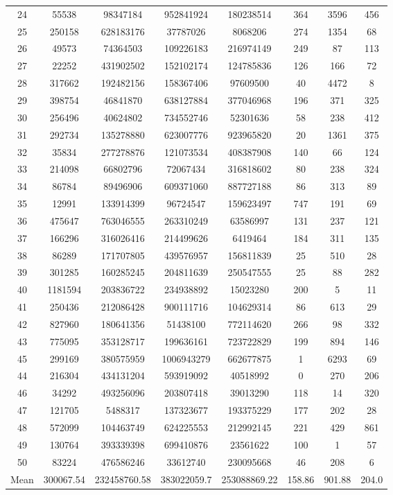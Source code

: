 \documentclass[solution, letterpaper]{cs121}
\begin{document}
\begin{center}
\begin{tabular}{ c |c c c c c c c}
24 & 55538 & 98347184 & 952841924 & 180238514 & 364 & 3596 & 456 \\
25 & 250158 & 628183176 & 37787026 & 8068206 & 274 & 1354 & 68 \\
26 & 49573 & 74364503 & 109226183 & 216974149 & 249 & 87 & 113 \\
27 & 22252 & 431902502 & 152102174 & 124785836 & 126 & 166 & 72 \\
28 & 317662 & 192482156 & 158367406 & 97609500 & 40 & 4472 & 8 \\
29 & 398754 & 46841870 & 638127884 & 377046968 & 196 & 371 & 325 \\
30 & 256496 & 40624802 & 734552746 & 52301636 & 58 & 238 & 412 \\
31 & 292734 & 135278880 & 623007776 & 923965820 & 20 & 1361 & 375 \\
32 & 35834 & 277278876 & 121073534 & 408387908 & 140 & 66 & 124 \\
33 & 214098 & 66802796 & 72067434 & 316818602 & 80 & 238 & 324 \\
34 & 86784 & 89496906 & 609371060 & 887727188 & 86 & 313 & 89 \\
35 & 12991 & 133914399 & 96724547 & 159623497 & 747 & 191 & 69 \\
36 & 475647 & 763046555 & 263310249 & 63586997 & 131 & 237 & 121 \\
37 & 166296 & 316026416 & 214499626 & 6419464 & 184 & 311 & 135 \\
38 & 86289 & 171707805 & 439576957 & 156811839 & 25 & 510 & 28 \\
39 & 301285 & 160285245 & 204811639 & 250547555 & 25 & 88 & 282 \\
40 & 1181594 & 203836722 & 234938892 & 15023280 & 200 & 5 & 11 \\
41 & 250436 & 212086428 & 900111716 & 104629314 & 86 & 613 & 29 \\
42 & 827960 & 180641356 & 51438100 & 772114620 & 266 & 98 & 332 \\
43 & 775095 & 353128717 & 199636161 & 723722829 & 199 & 894 & 146 \\
45 & 299169 & 380575959 & 1006943279 & 662677875 & 1 & 6293 & 69 \\
44 & 216304 & 434131204 & 593919092 & 40518992 & 0 & 270 & 206 \\
46 & 34292 & 493256096 & 203807418 & 39013290 & 118 & 14 & 320 \\
47 & 121705 & 5488317 & 137323677 & 193375229 & 177 & 202 & 28 \\
48 & 572099 & 104463749 & 624225553 & 212992145 & 221 & 429 & 861 \\
49 & 130764 & 393339398 & 699410876 & 23561622 & 100 & 1 & 57 \\
50 & 83224 & 476586246 & 33612740 & 230095668 & 46 & 208 & 6 \\ \hline
Mean & 300067.54 & 232458760.58 & 383022059.7 & 253088869.22 & 158.86 & 901.88 & 204.0 \\
\end{tabular}
\end{center}
\end{document}
